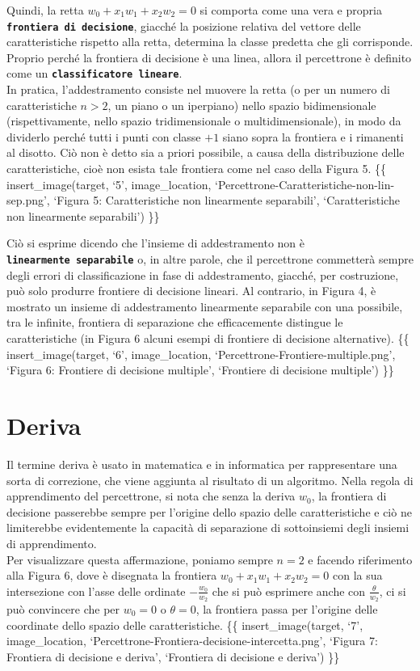 \documentclass[
  letterpaper,
  DIV=11,
  numbers=noendperiod]{scrreprt}
\begin{document}
Quindi, la retta \(w_0+x_1w_1+x_2w_2=0\) si comporta come una vera e
propria \textbf{\texttt{frontiera\ di\ decisione}}, giacché la posizione
relativa del vettore delle caratteristiche rispetto alla retta,
determina la classe predetta che gli corrisponde. Proprio perché la
frontiera di decisione è una linea, allora il percettrone è definito
come un \textbf{\texttt{classificatore\ lineare}}.\\
In pratica, l'addestramento consiste nel muovere la retta (o per un
numero di caratteristiche \(n>2\), un piano o un iperpiano) nello spazio
bidimensionale (rispettivamente, nello spazio tridimensionale o
multidimensionale), in modo da dividerlo perché tutti i punti con classe
\(+1\) siano sopra la frontiera e i rimanenti al disotto. Ciò non è
detto sia a priori possibile, a causa della distribuzione delle
caratteristiche, cioè non esista tale frontiera come nel caso della
Figura 5. \{\{ insert\_image(target, `5', image\_location,
`Percettrone-Caratteristiche-non-lin-sep.png', `Figura 5:
Caratteristiche non linearmente separabili', `Caratteristiche non
linearmente separabili') \}\}

Ciò si esprime dicendo che l'insieme di addestramento non è
\textbf{\texttt{linearmente\ separabile}} o, in altre parole, che il
percettrone commetterà sempre degli errori di classificazione in fase di
addestramento, giacché, per costruzione, può solo produrre frontiere di
decisione lineari. Al contrario, in Figura 4, è mostrato un insieme di
addestramento linearmente separabile con una possibile, tra le infinite,
frontiera di separazione che efficacemente distingue le caratteristiche
(in Figura 6 alcuni esempi di frontiere di decisione alternative). \{\{
insert\_image(target, `6', image\_location,
`Percettrone-Frontiere-multiple.png', `Figura 6: Frontiere di decisione
multiple', `Frontiere di decisione multiple') \}\}

\section{Deriva}\label{deriva}

Il termine deriva è usato in matematica e in informatica per
rappresentare una sorta di correzione, che viene aggiunta al risultato
di un algoritmo. Nella regola di apprendimento del percettrone, si nota
che senza la deriva \(w_0\), la frontiera di decisione passerebbe sempre
per l'origine dello spazio delle caratteristiche e ciò ne limiterebbe
evidentemente la capacità di separazione di sottoinsiemi degli insiemi
di apprendimento.\\
Per visualizzare questa affermazione, poniamo sempre \(n=2\) e facendo
riferimento alla Figura 6, dove è disegnata la frontiera
\(w_0+x_1w_1+x_2w_2=0\) con la sua intersezione con l'asse delle
ordinate \(-\frac{w_0}{w_2}\) che si può esprimere anche con
\(\frac{\theta}{w_2}\), ci si può convincere che per \(w_0=0\) o
\(\theta=0\), la frontiera passa per l'origine delle coordinate dello
spazio delle caratteristiche. \{\{ insert\_image(target, `7',
image\_location, `Percettrone-Frontiera-decisione-intercetta.png',
`Figura 7: Frontiera di decisione e deriva', `Frontiera di decisione e
deriva') \}\}
\end{document}
